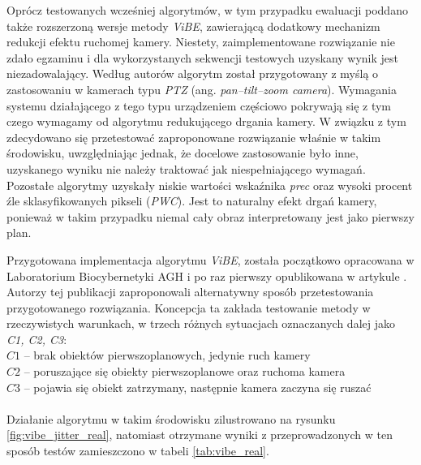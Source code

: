 Oprócz testowanych wcześniej algorytmów, w tym przypadku ewaluacji poddano także rozszerzoną wersje metody \textit{ViBE}, zawierającą dodatkowy mechanizm redukcji efektu ruchomej kamery. 
Niestety, zaimplementowane rozwiązanie nie zdało egzaminu i dla wykorzystanych sekwencji testowych uzyskany wynik jest niezadowalający. Według autorów algorytm został przygotowany z myślą o zastosowaniu w kamerach typu \textit{PTZ} (ang. \textit{pan–tilt–zoom camera}). Wymagania systemu działającego z tego typu urządzeniem częściowo pokrywają się z tym czego wymagamy od algorytmu redukującego drgania kamery. W związku z tym zdecydowano się przetestować zaproponowane rozwiązanie właśnie w takim środowisku, uwzględniając jednak, że docelowe zastosowanie było inne, uzyskanego wyniku nie należy traktować jak niespełniającego wymagań.
Pozostałe algorytmy uzyskały niskie wartości wskaźnika \textit{prec} oraz wysoki procent źle sklasyfikowanych pikseli (\textit{PWC}). 
Jest to naturalny efekt drgań kamery, ponieważ w takim przypadku niemal cały obraz interpretowany jest jako pierwszy plan.

Przygotowana implementacja algorytmu \textit{ViBE}, została początkowo opracowana w Laboratorium Biocybernetyki AGH i po raz pierwszy opublikowana w artykule \cite{kryjak_14_vibe}. 
Autorzy tej publikacji zaproponowali alternatywny sposób przetestowania przygotowanego rozwiązania. 
Koncepcja ta zakłada testowanie metody w rzeczywistych warunkach, w trzech różnych sytuacjach oznaczanych dalej jako \textit{C1, C2, C3}:\\
\-\hspace{1cm} $C1$ -- brak obiektów pierwszoplanowych, jedynie ruch kamery\\
\-\hspace{1cm} $C2$ -- poruszające się obiekty pierwszoplanowe oraz ruchoma kamera\\
\-\hspace{1cm} $C3$ -- pojawia się obiekt zatrzymany, następnie kamera zaczyna się ruszać\\
\\
\noindent Działanie algorytmu w takim środowisku zilustrowano na rysunku \ref{fig:vibe_jitter_real}, natomiast otrzymane wyniki z przeprowadzonych w ten sposób testów zamieszczono w tabeli \ref{tab:vibe_real}.

